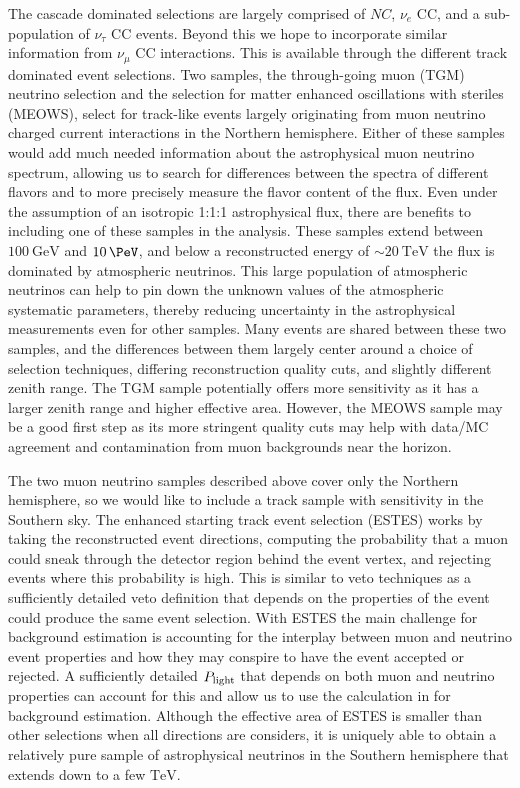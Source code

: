 The cascade dominated selections are largely comprised of $NC$, $\nu_e$ CC, and a sub-population of $\nu_\tau$ CC events.
Beyond this we hope to incorporate similar information from $\nu_\mu$ CC interactions.
This is available through the different track dominated event selections.
Two samples, the through-going muon (TGM) neutrino selection and the selection for matter enhanced oscillations with steriles (MEOWS), select for track-like events largely originating from muon neutrino charged current interactions in the Northern hemisphere.
Either of these samples would add much needed information about the astrophysical muon neutrino spectrum, allowing us to search for differences between the spectra of different flavors and to more precisely measure the flavor content of the flux.
Even under the assumption of an isotropic 1:1:1 astrophysical flux, there are benefits to including one of these samples in the analysis.
These samples extend between $\SI{100}\GeV$ and $\SI{10}\PeV$, and below a reconstructed energy of $\sim\SI{20}\TeV$ the flux is dominated by atmospheric neutrinos.
This large population of atmospheric neutrinos can help to pin down the unknown values of the atmospheric systematic parameters, thereby reducing uncertainty in the astrophysical measurements even for other samples.
Many events are shared between these two samples, and the differences between them largely center around a choice of selection techniques, differing reconstruction quality cuts, and slightly different zenith range.
The TGM sample potentially offers more sensitivity as it has a larger zenith range and higher effective area.
However, the MEOWS sample may be a good first step as its more stringent quality cuts may help with data/MC agreement and contamination from muon backgrounds near the horizon.

The two muon neutrino samples described above cover only the Northern hemisphere, so we would like to include a track sample with sensitivity in the Southern sky.
The enhanced starting track event selection (ESTES) works by taking the reconstructed event directions, computing the probability that a muon could sneak through the detector region behind the event vertex, and rejecting events where this probability is high.
This is similar to veto techniques as a sufficiently detailed veto definition that depends on the properties of the event could produce the same event selection.
With ESTES the main challenge for background estimation is accounting for the interplay between muon and neutrino event properties and how they may conspire to have the event accepted or rejected.
A sufficiently detailed $P_{\rm light}$ that depends on both muon and neutrino properties can account for this and allow us to use the calculation in  for background estimation.
Although the effective area of ESTES is smaller than other selections when all directions are considers, it is uniquely able to obtain a relatively pure sample of astrophysical neutrinos in the Southern hemisphere that extends down to a few $\si\TeV$.

